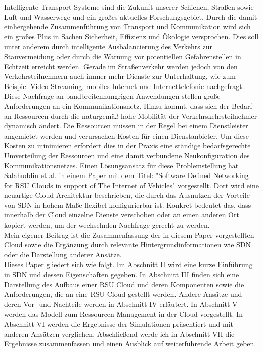 \documentclass[conference]{IEEEtran}
\begin{document}
Intelligente Transport Systeme sind die Zukunft unserer Schienen, Straßen sowie Luft-und Wasserwege und ein großes aktuelles Forschungsgebiet. Durch die damit einhergehende Zusammenführung von Transport und Kommunikation wird sich ein großes Plus in Sachen Sicherheit, Effizienz und Ökologie versprochen. Dies soll unter anderem durch intelligente Ausbalancierung des Verkehrs zur Stauvermeidung oder durch die Warnung vor potentiellen Gefahrenstellen in Echtzeit erreicht werden. Gerade im Straßenverkehr werden jedoch von den Verkehrsteilnehmern auch immer mehr Dienste zur Unterhaltung, wie zum Beispiel Video Streaming, mobiles Internet und Internettelefonie nachgefragt. Diese Nachfrage an bandbreitenhungrigen Anwendungen stellen große Anforderungen an ein Kommunikationsnetz. Hinzu kommt, dass sich der Bedarf an Ressourcen durch die naturgemäß hohe Mobilität der Verkehrskehrsteilnehmer dynamisch ändert. Die Ressourcen müssen in der Regel bei einem Dienstleister angemietet werden und verursachen Kosten für einen Dienstanbieter. Um diese Kosten zu minimieren erfordert dies in der Praxis eine ständige bedarfsgerechte Umverteilung der Ressourcen  und eine damit verbundene Neukonfiguration des Kommunikationsnetzes. Einen Lösungsansatz für diese Problemstellung hat Salahuddin et al. in einem Paper mit dem Titel: "Software Defined Networking for RSU Clouds in support of The Internet of Vehicles" vorgestellt. Dort wird eine neuartige Cloud Architektur beschrieben, die durch das Ausnutzen der Vorteile von SDN in hohem Maße flexibel konfigurierbar ist. Konkret bedeutet das, dass innerhalb der Cloud einzelne Dienste verschoben oder an einen anderen Ort kopiert werden, um der wechselnden Nachfrage gerecht zu werden.\\
Mein eigener Beitrag ist die Zusammenfassung der in diesem Paper vorgestellten Cloud sowie die Ergänzung durch relevante Hintergrundinformationen wie SDN oder die Darstellung anderer Ansätze.\\
Dieses Paper gliedert sich wie folgt. Im Abschnitt II wird eine kurze Einführung in SDN und dessen Eigenschaften gegeben. In Abschnitt III finden sich eine Darstellung des Aufbaus einer RSU Cloud und deren Komponenten sowie die Anforderungen, die an eine RSU Cloud gestellt werden. Andere Ansätze und deren Vor- und Nachteile werden in Abschnitt IV erläutert. In Abschnitt V werden das Modell zum Ressourcen Management in der Cloud vorgestellt.  In Abschnitt VI werden die Ergebnisse der Simulationen präsentiert und mit anderen Ansätzen verglichen. Abschließend werde ich in Abschnitt VII die Ergebnisse zusammenfassen und einen Ausblick auf weiterführende Arbeit geben.
\end{document}
